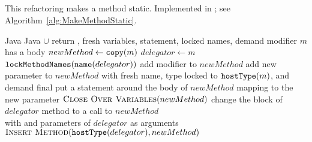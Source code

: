 \subsection{}
This refactoring makes a method static. Implemented in ; see Algorithm~\ref{alg:MakeMethodStatic}.

\begin{algorithm}[p]
\caption{$\refactoring{Make Method Static}(m : \type{Method})$}\label{alg:MakeMethodStatic}
\begin{algorithmic}[1]
\REQUIRE Java
\ENSURE Java $\cup$ return , fresh variables,  statement, locked names, demand  modifier
\medskip
  \STATE \assert $m$ has a body
  \STATE $newMethod\leftarrow \text{\texttt{copy}}(m)$
  \STATE $delegator\leftarrow m$
  \STATE $\text{\texttt{lockMethodNames}}(\text{\texttt{name}}(delegator))$
  \STATE add  modifier to $newMethod$
  \STATE add new parameter to $newMethod$ with fresh name, type locked to $\text{\texttt{hostType}}(m)$, and demand final
  \STATE put a  statement around the body of $newMethod$ mapping  to the new parameter
  \STATE $\textsc{Close Over Variables}(newMethod)$
  \STATE change the block of $delegator$ method to a call to $newMethod$ \\
  	with  and parameters of $delegator$ as arguments
  \STATE $\textsc{Insert Method}(\text{\texttt{hostType}}(delegator), newMethod)$
\end{algorithmic}
\end{algorithm}



